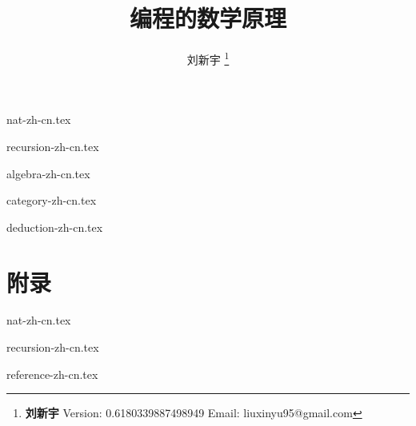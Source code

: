 \documentclass[UTF8, a4paper,twoside]{book} %
\begin{document}


\title{{\bf \Huge 编程的数学原理}
  \centering
            }

\author{刘新宇
  \thanks{{\bfseries 刘新宇} \newline
    Version: 0.6180339887498949 \newline
    Email: liuxinyu95@gmail.com \newline
    }}

\maketitle


\tableofcontents
\newpage

{nat-zh-cn.tex}

{recursion-zh-cn.tex}

{algebra-zh-cn.tex}

{category-zh-cn.tex}

{deduction-zh-cn.tex}

\part{附录}
\appendix
\noappendicestocpagenum
\addappheadtotoc

{nat-zh-cn.tex}

{recursion-zh-cn.tex}

{reference-zh-cn.tex}

%

\printindex
\end{document}
